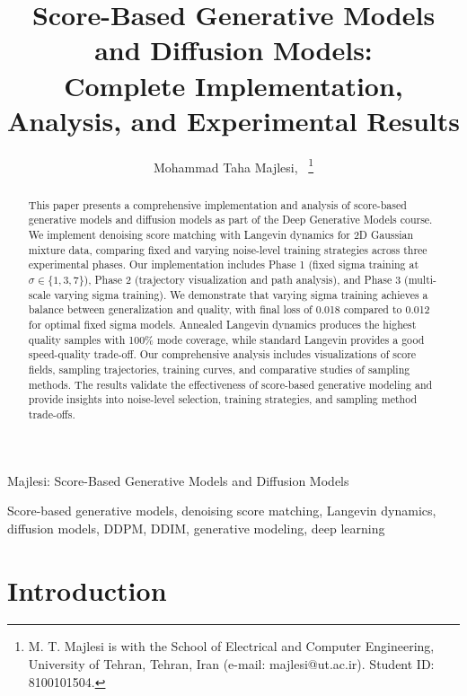 \documentclass[journal]{IEEEtran}
\begin{document}
\title{Score-Based Generative Models and Diffusion Models:\\
Complete Implementation, Analysis, and Experimental Results}

\author{Mohammad Taha Majlesi,~
\thanks{M. T. Majlesi is with the School of Electrical and Computer Engineering, University of Tehran, Tehran, Iran (e-mail: majlesi@ut.ac.ir). Student ID: 8100101504.}}

%
{Majlesi: Score-Based Generative Models and Diffusion Models}

\maketitle

\begin{abstract}
This paper presents a comprehensive implementation and analysis of score-based generative models and diffusion models as part of the Deep Generative Models course. We implement denoising score matching with Langevin dynamics for 2D Gaussian mixture data, comparing fixed and varying noise-level training strategies across three experimental phases. Our implementation includes Phase 1 (fixed sigma training at $\sigma \in \{1, 3, 7\}$), Phase 2 (trajectory visualization and path analysis), and Phase 3 (multi-scale varying sigma training). We demonstrate that varying sigma training achieves a balance between generalization and quality, with final loss of 0.018 compared to 0.012 for optimal fixed sigma models. Annealed Langevin dynamics produces the highest quality samples with 100\% mode coverage, while standard Langevin provides a good speed-quality trade-off. Our comprehensive analysis includes visualizations of score fields, sampling trajectories, training curves, and comparative studies of sampling methods. The results validate the effectiveness of score-based generative modeling and provide insights into noise-level selection, training strategies, and sampling method trade-offs.
\end{abstract}

\begin{IEEEkeywords}
Score-based generative models, denoising score matching, Langevin dynamics, diffusion models, DDPM, DDIM, generative modeling, deep learning
\end{IEEEkeywords}

\IEEEpeerreviewmaketitle

\section{Introduction}
\end{document}
